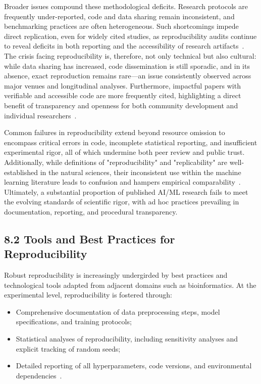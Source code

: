 \documentclass[11pt]{article}
\begin{document}
Broader issues compound these methodological deficits. Research protocols are frequently under-reported, code and data sharing remain inconsistent, and benchmarking practices are often heterogeneous. Such shortcomings impede direct replication, even for widely cited studies, as reproducibility audits continue to reveal deficits in both reporting and the accessibility of research artifacts~\cite{ref107, ref108}. The crisis facing reproducibility is, therefore, not only technical but also cultural: while data sharing has increased, code dissemination is still sporadic, and in its absence, exact reproduction remains rare—an issue consistently observed across major venues and longitudinal analyses. Furthermore, impactful papers with verifiable and accessible code are more frequently cited, highlighting a direct benefit of transparency and openness for both community development and individual researchers~\cite{ref108}.

Common failures in reproducibility extend beyond resource omission to encompass critical errors in code, incomplete statistical reporting, and insufficient experimental rigor, all of which undermine both peer review and public trust. Additionally, while definitions of "reproducibility" and "replicability" are well-established in the natural sciences, their inconsistent use within the machine learning literature leads to confusion and hampers empirical comparability~\cite{ref108}. Ultimately, a substantial proportion of published AI/ML research fails to meet the evolving standards of scientific rigor, with ad hoc practices prevailing in documentation, reporting, and procedural transparency.

\subsection{8.2 Tools and Best Practices for Reproducibility}

Robust reproducibility is increasingly undergirded by best practices and technological tools adapted from adjacent domains such as bioinformatics. At the experimental level, reproducibility is fostered through:

\begin{itemize}
  \item Comprehensive documentation of data preprocessing steps, model specifications, and training protocols;
  \item Statistical analyses of reproducibility, including sensitivity analyses and explicit tracking of random seeds;
  \item Detailed reporting of all hyperparameters, code versions, and environmental dependencies~\cite{ref108}.
\end{itemize}
\end{document}

